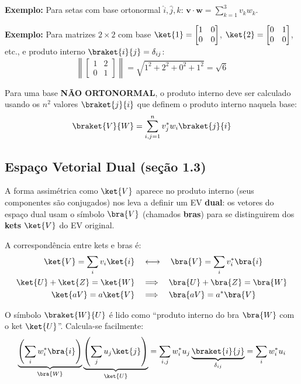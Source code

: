{\bf Exemplo:} Para setas com base ortonormal $\hat{i},\hat{j},\hat{k}$:
${\bm v}\cdot{\bm w} = \sum_{k=1}^3 v_k w_k$.

{\bf Exemplo:} Para matrizes $2\times2$ com base $\ket{1}=\begin{bmatrix}1&0\\0&0\end{bmatrix}$, $\ket{2}=\begin{bmatrix}0&1\\0&0\end{bmatrix}$, etc., e produto interno $\braket{i}{j}=\delta_{ij}$:
\[
    \left\|\begin{bmatrix} 1 & 2 \\ 0 & 1 \end{bmatrix}\right\| = \sqrt{1^2+2^2+0^2+1^2} = \sqrt{6}
\]

\begin{observacao}[]{}
    Para uma base \textbf{NÃO ORTONORMAL}, o produto interno deve ser calculado usando os $n^2$ valores $\braket{j}{i}$ que definem o produto interno naquela base:
    \[
        \braket{V}{W} = \sum_{i,j=1}^n v_j^* w_i \braket{j}{i}
    \]
\end{observacao}

\subsection*{Espaço Vetorial Dual (seção 1.3)}

A forma assimétrica como $\ket{V}$ aparece no produto interno (seus componentes são conjugados) nos leva a definir um EV \textbf{dual}: os vetores do espaço dual usam o símbolo $\bra{V}$ (chamados \textbf{bras}) para se distinguirem dos \textbf{kets} $\ket{V}$ do EV original.

A correspondência entre kets e bras é:
\begin{align}
    \ket{V} = \sum_i v_i \ket{i} \quad &\longleftrightarrow \quad \bra{V} = \sum_i v_i^* \bra{i} \\
    \ket{U} + \ket{Z} = \ket{W} \quad &\Longrightarrow \quad \bra{U} + \bra{Z} = \bra{W} \\
    \ket{aV} = a\ket{V} \quad &\Longrightarrow \quad \bra{aV} = a^*\bra{V}
\end{align}

O símbolo $\braket{W}{U}$ é lido como ``produto interno do bra $\bra{W}$ com o ket $\ket{U}$''. Calcula-se facilmente:
\[
    \underbrace{\left(\sum_i w_i^* \bra{i}\right)}_{\bra{W}} \underbrace{\left(\sum_j u_j \ket{j}\right)}_{\ket{U}}
    = \sum_{i,j} w_i^* u_j \underbrace{\braket{i}{j}}_{\delta_{ij}}
    = \sum_i w_i^* u_i
\]

